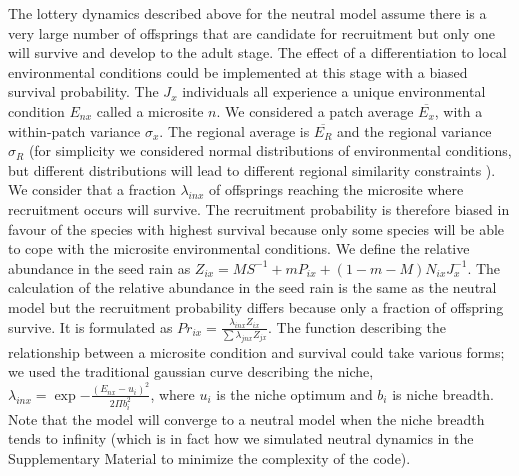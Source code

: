 \documentclass[12pt]{article}
\begin{document}
The lottery dynamics described above for the neutral model assume there is a
very large number of offsprings that are candidate for recruitment but only one
will survive and develop to the adult stage. The effect of a differentiation to
local environmental conditions could be implemented at this stage with a biased
survival probability. The $J_x$ individuals all experience a unique
environmental condition $E_{nx}$ called a microsite $n$. We considered a patch
average $\overline{E_x}$, with a within-patch variance $\sigma_x$. The regional
average is $\overline{E_R}$ and the regional variance $\sigma_R$ (for simplicity
we considered normal distributions of environmental conditions, but different
distributions will lead to different regional similarity constraints
\parencite{Mouquet2003,Tilman2004,Gravel2006}). We consider that a fraction
$\lambda_{inx}$ of offsprings reaching the microsite where recruitment occurs
will survive. The recruitment probability is therefore biased in favour of the
species with highest survival because only some species will be able to cope
with the microsite environmental conditions. We define the relative
abundance in the seed rain as $Z_{ix} = MS^{-1} + mP_{ix} +
(1-m-M)N_{ix}J_x^{-1}$. The calculation of the relative abundance in the seed
rain is the same as the neutral model but the recruitment probability differs
because only a fraction of offspring survive. It is formulated as $Pr_{ix} =
\frac{\lambda_{inx}Z_{ix}}{\sum \lambda_{jnx}Z_{jx}}$. The function describing
the relationship between a microsite condition and survival could take various
forms; we used the traditional gaussian curve describing the niche,
$\lambda_{inx} = \exp{-\frac{(E_{nx}-u_i)^2}{2\Pi b_i^2}}$, where $u_i$ is the
niche optimum and $b_i$ is niche breadth. Note that the model will converge to a
neutral model when the niche breadth tends to infinity (which is in fact how we
simulated neutral dynamics in the Supplementary Material to minimize the
complexity of the code).
\end{document}
